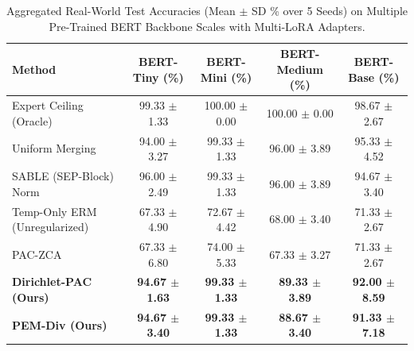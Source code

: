 \begin{table}[t]
\caption{Aggregated Real-World Test Accuracies (Mean $\pm$ SD \% over 5 Seeds) on Multiple Pre-Trained BERT Backbone Scales with Multi-LoRA Adapters.}
\label{tab:real_world_results}
\vskip 0.15in
\begin{center}
\begin{small}
\begin{sc}
\begin{tabular}{lcccc}
\toprule
\textbf{Method} & \textbf{BERT-Tiny (\%)} & \textbf{BERT-Mini (\%)} & \textbf{BERT-Medium (\%)} & \textbf{BERT-Base (\%)} \\
\midrule
Expert Ceiling (Oracle) & 99.33 $\pm$ 1.33 & 100.00 $\pm$ 0.00 & 100.00 $\pm$ 0.00 & 98.67 $\pm$ 2.67 \\
Uniform Merging & 94.00 $\pm$ 3.27 & 99.33 $\pm$ 1.33 & 96.00 $\pm$ 3.89 & 95.33 $\pm$ 4.52 \\
SABLE (SEP-Block) Norm & 96.00 $\pm$ 2.49 & 99.33 $\pm$ 1.33 & 96.00 $\pm$ 3.89 & 94.67 $\pm$ 3.40 \\
\midrule
Temp-Only ERM (Unregularized) & 67.33 $\pm$ 4.90 & 72.67 $\pm$ 4.42 & 68.00 $\pm$ 3.40 & 71.33 $\pm$ 2.67 \\
PAC-ZCA & 67.33 $\pm$ 6.80 & 74.00 $\pm$ 5.33 & 67.33 $\pm$ 3.27 & 71.33 $\pm$ 2.67 \\
\textbf{Dirichlet-PAC (Ours)} & \textbf{94.67 $\pm$ 1.63} & \textbf{99.33 $\pm$ 1.33} & \textbf{89.33 $\pm$ 3.89} & \textbf{92.00 $\pm$ 8.59} \\
\textbf{PEM-Div (Ours)} & \textbf{94.67 $\pm$ 3.40} & \textbf{99.33 $\pm$ 1.33} & \textbf{88.67 $\pm$ 3.40} & \textbf{91.33 $\pm$ 7.18} \\
\bottomrule
\end{tabular}
\end{sc}
\end{small}
\end{center}
\vskip -0.1in
\end{table}


